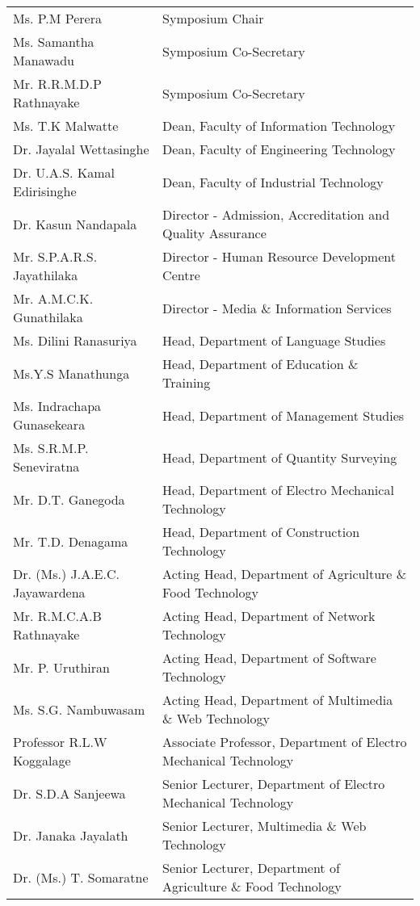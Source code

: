 \begin{longtable}{ L{4.8cm}  L{6.5cm} } 
   
    Ms. P.M Perera & Symposium Chair \\
    Ms. Samantha Manawadu & Symposium Co-Secretary \\
    Mr. R.R.M.D.P Rathnayake & Symposium Co-Secretary \\
    Ms. T.K Malwatte & Dean, Faculty of Information Technology \\
    Dr. Jayalal Wettasinghe & Dean, Faculty of Engineering Technology \\
    Dr. U.A.S. Kamal Edirisinghe & Dean, Faculty of Industrial Technology \\
    Dr. Kasun Nandapala & Director - Admission, Accreditation and Quality Assurance \\
    Mr. S.P.A.R.S. Jayathilaka & Director - Human Resource Development Centre \\
    Mr. A.M.C.K. Gunathilaka & Director - Media \& Information Services \\
    Ms. Dilini Ranasuriya & Head, Department of Language Studies \\
    Ms.Y.S Manathunga & Head, Department of Education \& Training \\
    Ms. Indrachapa Gunasekeara & Head, Department of Management Studies \\
    Ms. S.R.M.P. Seneviratna & Head, Department of Quantity Surveying \\
    Mr. D.T. Ganegoda & Head, Department of Electro Mechanical Technology \\
    Mr. T.D. Denagama & Head, Department of Construction Technology \\
    Dr. (Ms.) J.A.E.C. Jayawardena & Acting Head, Department of Agriculture \& Food Technology \\
    Mr. R.M.C.A.B Rathnayake & Acting Head, Department of Network Technology \\
    Mr. P. Uruthiran & Acting Head, Department of Software Technology \\
    Ms. S.G. Nambuwasam & Acting Head, Department of Multimedia \& Web Technology \\
    Professor R.L.W Koggalage & Associate Professor, Department of Electro Mechanical Technology \\
    Dr. S.D.A Sanjeewa & Senior Lecturer, Department of Electro Mechanical Technology \\
    Dr. Janaka Jayalath & Senior Lecturer, Multimedia \& Web Technology \\
    Dr. (Ms.) T. Somaratne & Senior Lecturer, Department of Agriculture \& Food Technology \\
    

\end{longtable}
